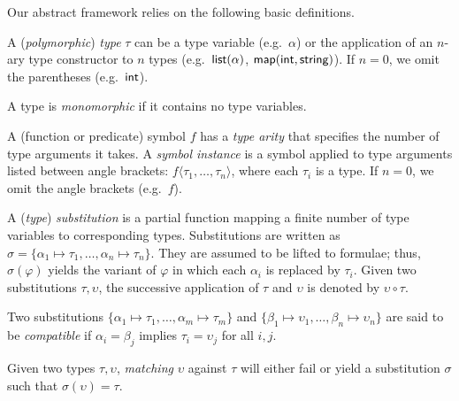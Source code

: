 \documentclass[runningheads]{llncs}
\begin{document}
Our abstract framework relies on the following basic definitions.

\begin{definition}\rm
A (\emph{polymorphic}) \emph{type} \(\tau\) can be a type variable (e.g.\ \(\alpha\)) or
the application of an \(n\)-ary type constructor to \(n\) types (e.g.\ \(\textsf{list}(\alpha)\), \(\textsf{map}(\textsf{int},\textsf{string})\)).
If $n = 0$, we omit the parentheses (e.g.\ \(\textsf{int}\)).
\end{definition}

\begin{definition}\rm
A type is \emph{monomorphic} if it contains no type variables.
\end{definition}

\begin{definition}\rm
A (function or predicate) {symbol} \(f\) has a \emph{type arity} that specifies the number of type arguments it takes. A \emph{symbol instance} is a symbol applied to type arguments listed between angle brackets: \(f\langle \tau_1, \dots, \tau_n\rangle\), where each $\tau_i$ is a type. If $n = 0$, we omit the angle brackets (e.g.\ $f$).
\end{definition}

\begin{definition}\rm
A (\emph{type}) \emph{substitution} is a partial function mapping a finite number of type variables to corresponding types. Substitutions are written as
$\sigma = \{\alpha_1\mapsto\tau_1, \dots, \alpha_n\mapsto\tau_n\}$. They are assumed to be lifted to formulae; thus, $\sigma(\varphi)$ yields the variant of $\varphi$ in which each $\alpha_i$ is replaced by $\tau_i$.
Given two substitutions \(\tau, \upsilon\), the successive application of \(\tau\) and \(\upsilon\) is denoted by \(\upsilon \circ \tau\).
\end{definition}

\begin{definition}\rm
Two substitutions \(\{\alpha_1 \mapsto \tau_1, \dots, \alpha_m\mapsto\tau_m\}\) and \(\{\beta_1 \mapsto \upsilon_1, \dots,\allowbreak \beta_n\mapsto\upsilon_n\}\) are said to be \emph{compatible} if \(\alpha_i = \beta_j\) implies \(\tau_i = \upsilon_j\) for all \(i, j\).
\end{definition}

\begin{definition}\rm
Given two types \(\tau, \upsilon\), \emph{matching} \(\upsilon\) against \(\tau\) will either fail or yield a substitution \(\sigma\) such that \(\sigma(\upsilon) = \tau\).
\end{definition}
\end{document}
